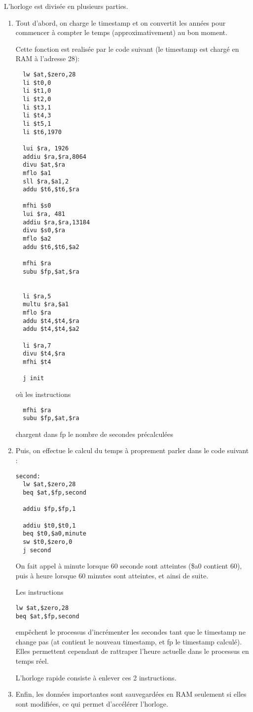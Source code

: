 L'horloge est divisée en plusieurs parties.

\begin{enumerate}
\item Tout d'abord, on charge le timestamp et on convertit les années pour commencer à compter le temps (approximativement) au bon moment.

Cette fonction est realisée par le code suivant (le timestamp est chargé en RAM à l'adresse 28):
\begin{verbatim}
  lw $at,$zero,28
  li $t0,0
  li $t1,0
  li $t2,0
  li $t3,1
  li $t4,3
  li $t5,1
  li $t6,1970
  
  lui $ra, 1926
  addiu $ra,$ra,8064
  divu $at,$ra
  mflo $a1
  sll $ra,$a1,2
  addu $t6,$t6,$ra
  
  mfhi $s0
  lui $ra, 481
  addiu $ra,$ra,13184
  divu $s0,$ra
  mflo $a2
  addu $t6,$t6,$a2

  mfhi $ra
  subu $fp,$at,$ra

  
  li $ra,5
  multu $ra,$a1
  mflo $ra
  addu $t4,$t4,$ra  
  addu $t4,$t4,$a2
  
  li $ra,7
  divu $t4,$ra
  mfhi $t4
  
  j init
\end{verbatim}

où les instructions
\begin{verbatim}
  mfhi $ra
  subu $fp,$at,$ra
\end{verbatim}
chargent dans fp le nombre de secondes précalculées

\item
Puis, on effectue le calcul du temps à proprement parler dans le code suivant :
\begin{verbatim}
second:
  lw $at,$zero,28
  beq $at,$fp,second

  addiu $fp,$fp,1

  addiu $t0,$t0,1
  beq $t0,$a0,minute
  sw $t0,$zero,0
  j second
\end{verbatim}

On fait appel à minute lorsque 60 seconde sont atteintes (\$a0 contient 60), puis à heure lorsque 60 minutes sont atteintes, et ainsi de suite.

Les instructions 
\begin{verbatim}
lw $at,$zero,28
beq $at,$fp,second
\end{verbatim}

empêchent le processus d'incrémenter les secondes tant que le timestamp ne change pas (at contient le nouveau timestamp, et fp le timestamp calculé). Elles permettent cependant de rattraper l'heure actuelle dans le processus en temps réel.

L'horloge rapide consiste à enlever ces 2 instructions.

\item
Enfin, les données importantes sont sauvegardées en RAM seulement si elles sont modifiées, ce qui permet d'accélérer l'horloge.

\end{enumerate}
